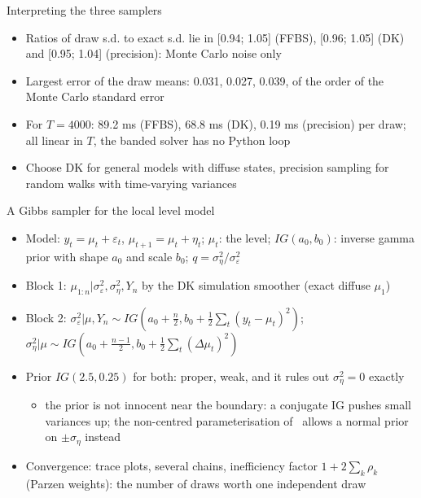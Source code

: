 \begin{frame}{Interpreting the three samplers}
\itemsize{\small}
\begin{itemize}
    \item Ratios of draw s.d. to exact s.d. lie in [0.94; 1.05] (FFBS), [0.96; 1.05] (DK) and [0.95; 1.04] (precision): Monte Carlo noise only
    \item Largest error of the draw means: 0.031, 0.027, 0.039, of the order of the Monte Carlo standard error
    \item For $T = 4000$: 89.2 ms (FFBS), 68.8 ms (DK), 0.19 ms (precision) per draw; all linear in $T$, the banded solver has no Python loop
    \item Choose DK for general models with diffuse states, precision sampling for random walks with time-varying variances
\end{itemize}
\end{frame}

\begin{frame}{A Gibbs sampler for the local level model}
\itemsize{\small}
\begin{itemize}
    \item Model: $y_t = \mu_t + \varepsilon_t$, $\mu_{t+1} = \mu_t + \eta_t$; $\mu_t$: the level; $IG(a_0, b_0)$: inverse gamma prior with shape $a_0$ and scale $b_0$; $q = \sigma^2_\eta/\sigma^2_\varepsilon$
    \item Block 1: $\mu_{1:n} | \sigma^2_\varepsilon, \sigma^2_\eta, Y_n$ by the DK simulation smoother (exact diffuse $\mu_1$)
    \item Block 2: $\sigma^2_\varepsilon | \mu, Y_n \sim IG(a_0 + \frac n2, b_0 + \frac12\sum_t(y_t - \mu_t)^2)$; $\sigma^2_\eta | \mu \sim IG(a_0 + \frac{n-1}{2}, b_0 + \frac12\sum_t(\Delta\mu_t)^2)$
    \item Prior $IG(2.5, 0.25)$ for both: proper, weak, and it rules out $\sigma^2_\eta = 0$ exactly
    \begin{itemize}
        \item the prior is not innocent near the boundary: a conjugate IG pushes small variances up; the non-centred parameterisation of \ allows a normal prior on $\pm\sigma_\eta$ instead
    \end{itemize}
    \item Convergence: trace plots, several chains, inefficiency factor $1 + 2\sum_k\rho_k$ (Parzen weights): the number of draws worth one independent draw 
\end{itemize}
\end{frame}

